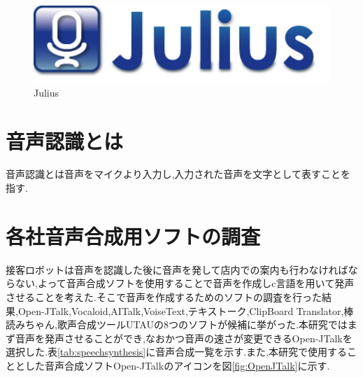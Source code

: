\documentclass[12pt,oneside]{sotsuken_paper}
\begin{document}
\begin{figure}[htbp]
\begin{center}
\includegraphics[width=120mm]{img/Julius.png}
\caption{Julius}
\label{fig:Julius}
\end{center}
\end{figure}


\section{音声認識とは}
音声認識とは音声をマイクより入力し,入力された音声を文字として表すことを指す.


\section{各社音声合成用ソフトの調査}
接客ロボットは音声を認識した後に音声を発して店内での案内も行わなければならない,よって音声合成ソフトを使用することで音声を作成しc言語を用いて発声させることを考えた.そこで音声を作成するためのソフトの調査を行った結果,Open-JTalk,Vocaloid,AITalk,VoiseText,テキストーク,ClipBoard Translator,棒読みちゃん,歌声合成ツールUTAUの8つのソフトが候補に挙がった.本研究ではまず音声を発声させることができ,なおかつ音声の速さが変更できるOpen-JTalkを選択した.表\ref{tab:speechsynthesis}に音声合成一覧を示す.また,本研究で使用することとした音声合成ソフトOpen-JTalkのアイコンを図\ref{fig:OpenJTalk}に示す.
\end{document}
